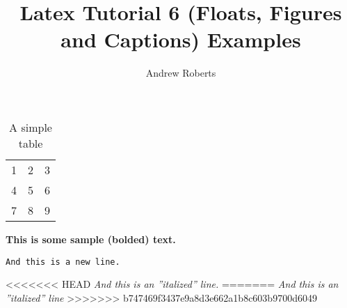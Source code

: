 \documentclass[english]{article}
\begin{document}
\title{Latex Tutorial 6 (Floats, Figures and Captions) Examples}
\author{Andrew Roberts}
\maketitle

\begin{table}[htp]
  \begin{center}
    \begin{tabular}{| l c r |}
    \hline
    1 & 2 & 3 \\
    4 & 5 & 6 \\
    7 & 8 & 9 \\
    \hline
    \end{tabular}
  \end{center}
  \caption{A simple table}
\end{table}

\textbf{This is some sample (bolded) text.}

\texttt{And this is a new line.}

<<<<<<< HEAD
\textit{And this is an ''italized'' line.}
=======
\textit{And this is an ''italized'' line}
>>>>>>> b747469f3437e9a8d3e662a1b8c603b9700d6049
\end{document}
